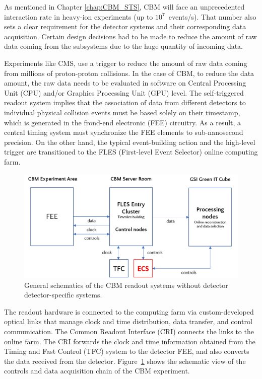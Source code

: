 
As mentioned in Chapter \ref{chap:CBM_STS}, \gls{CBM} will face an unprecedented interaction rate in heavy-ion experiments (up to $10^{7}$~events/s). That number also sets a clear requirement for the detector systems and their corresponding data acquisition. Certain design decisions had to be made to reduce the amount of raw data coming from the subsystems due to the huge quantity of incoming data.

Experiments like \gls{CMS}, use a trigger to \cite{CMS-DAQ} reduce the amount of raw data coming from millions of proton-proton collisions.  In the case of \gls{CBM}, to reduce the data amount, the raw data needs to be evaluated in software on Central Processing Unit (\gls{CPU}) and/or Graphics Processing Unit (\gls{GPU}) level. The self-triggered readout system implies that the association of data from different detectors to individual physical collision events must be based solely on their timestamp, which is generated in the frond-end electronic (\gls{FEE}) circuitry. As a result, a central timing system must synchronize the \gls{FEE} elements to sub-nanosecond precision. On the other hand, the typical event-building action and the high-level trigger are transitioned to the \gls{FLES} (First-level Event Selector) online computing farm. 


\begin{figure}[!h]
\centering
\includegraphics[width=0.7\columnwidth]{Chapter3/Controls/images/online.png}
\caption{General schematics of the CBM readout systems without detector detector-specific systems.}
\label{fig_controls}
\end{figure}


The readout hardware is connected to the computing farm via custom-developed optical links that manage clock and time distribution, data transfer, and control communication. The Common Readout Interface (\gls{CRI}) connects the links to the online farm. The \gls{CRI} forwards the clock and time information obtained from the Timing and Fast Control (\gls{TFC}) system to the detector \gls{FEE}, and also converts the data received from the detector. Figure~\ref{fig_controls} shows the schematic view of the controls and data acquisition chain of the \gls{CBM} experiment. 

